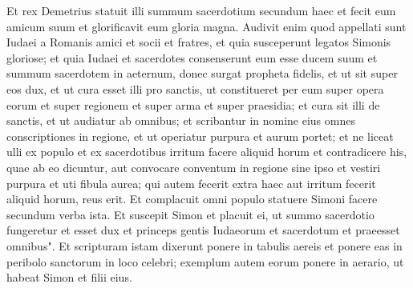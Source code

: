 \begin{biblechapter}
\verse Et rex Demetrius statuit illi summum sacerdotium secundum haec  
\verse et fecit eum amicum suum et glorificavit eum gloria magna. 
\verse Audivit enim quod appellati sunt Iudaei a Romanis amici et socii et fratres, et quia susceperunt legatos Simonis gloriose; 
\verse et quia Iudaei et sacerdotes consenserunt eum esse ducem suum et summum sacerdotem in aeternum, donec surgat propheta fidelis, 
\verse et ut sit super eos dux, et ut cura esset illi pro sanctis, ut constitueret per eum super opera eorum et super regionem et super arma et super praesidia; 
\verse et cura sit illi de sanctis, et ut audiatur ab omnibus; et scribantur in nomine eius omnes conscriptiones in regione, et ut operiatur purpura et aurum portet; 
\verse et ne liceat ulli ex populo et ex sacerdotibus irritum facere aliquid horum et contradicere his, quae ab eo dicuntur, aut convocare conventum in regione sine ipso et vestiri purpura et uti fibula aurea; 
\verse qui autem fecerit extra haec aut irritum fecerit aliquid horum, reus erit. 
\verse Et complacuit omni populo statuere Simoni facere secundum verba ista. 
\verse Et suscepit Simon et placuit ei, ut summo sacerdotio fungeretur et esset dux et princeps gentis Iudaeorum et sacerdotum et praeesset omnibus". 
\verse Et scripturam istam dixerunt ponere in tabulis aereis et ponere eas in peribolo sanctorum in loco celebri; 
\verse exemplum autem eorum ponere in aerario, ut habeat Simon et filii eius. 
\end{biblechapter}

